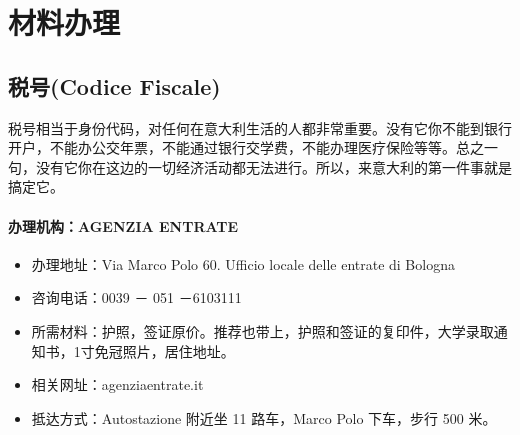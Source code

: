 
% 


\chapter{材料办理}                 %


\section{税号(Codice Fiscale)}
税号相当于身份代码，对任何在意大利生活的人都非常重要。没有它你不能到银行开户，不能办公交年票，不能通过银行交学费，不能办理医疗保险等等。总之一句，没有它你在这边的一切经济活动都无法进行。所以，来意大利的第一件事就是搞定它。

\subsubsection{办理机构：AGENZIA ENTRATE}

\begin{itemize}
\item 办理地址：Via Marco Polo 60. Ufficio locale delle entrate di Bologna
\item 咨询电话：0039 － 051 －6103111
\item 所需材料：护照，签证原价。推荐也带上，护照和签证的复印件，大学录取通知书，1寸免冠照片，居住地址。
\item 相关网址：agenziaentrate.it
\item 抵达方式：Autostazione 附近坐 11 路车，Marco Polo 下车，步行 500 米。
\end{itemize}


